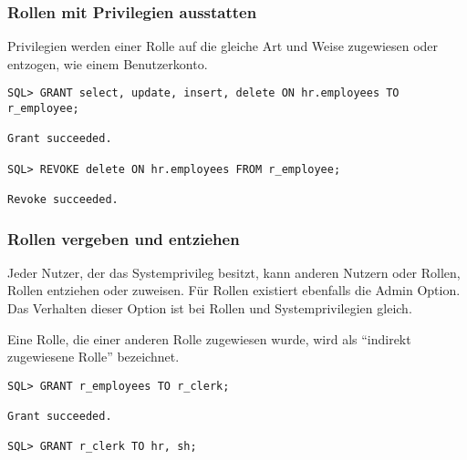         \subsubsection{Rollen mit Privilegien ausstatten}
          Privilegien werden einer Rolle auf die gleiche Art und Weise zugewiesen oder entzogen, wie einem Benutzerkonto.
          \begin{lstlisting}[caption={Eine Rolle mit Privilegien ausstatten},label=admin249,language=oracle_sql]
SQL> GRANT select, update, insert, delete ON hr.employees TO r_employee;

Grant succeeded.

SQL> REVOKE delete ON hr.employees FROM r_employee;

Revoke succeeded.
          \end{lstlisting}
        \subsubsection{Rollen vergeben und entziehen}
          Jeder Nutzer, der das Systemprivileg 
          besitzt, kann anderen Nutzern oder Rollen, Rollen entziehen oder
          zuweisen. F\"ur Rollen existiert ebenfalls die Admin Option. Das
          Verhalten dieser Option ist bei Rollen und Systemprivilegien gleich.
          \begin{merke}
            Eine Rolle, die einer anderen Rolle zugewiesen wurde, wird als \enquote{indirekt zugewiesene Rolle} bezeichnet.
          \end{merke}
          \begin{lstlisting}[caption={Zuweisen einer Rolle},label=admin250,language=oracle_sql]
SQL> GRANT r_employees TO r_clerk;

Grant succeeded.

SQL> GRANT r_clerk TO hr, sh;
          \end{lstlisting}
